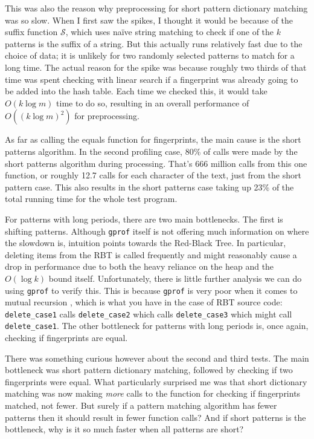 \documentclass[ %
                    author={Dominic Joseph Moylett},
                    degree={MEng},
                     title={Dictionary Matching with Fingerprints},
                  subtitle={An Empirical Analysis},
                      type={research},
                      year={2015} ]{dissertation}
\begin{document}
This was also the reason why preprocessing for short pattern dictionary matching was so slow. When I first saw the spikes, I thought it would be because of the suffix function $\mathcal{S}$, which uses na\"{i}ve string matching to check if one of the $k$ patterns is the suffix of a string. But this actually runs relatively fast due to the choice of data; it is unlikely for two randomly selected patterns to match for a long time. The actual reason for the spike was because roughly two thirds of that time was spent checking with linear search if a fingerprint was already going to be added into the hash table. Each time we checked this, it would take $O(k\log m)$ time to do so, resulting in an overall performance of $O((k\log m)^2)$ for preprocessing.

As far as calling the equals function for fingerprints, the main cause is the short patterns algorithm. In the second profiling case, 80\% of calls were made by the short patterns algorithm during processing. That's 666 million calls from this one function, or roughly 12.7 calls for each character of the text, just from the short pattern case. This also results in the short patterns case taking up 23\% of the total running time for the whole test program.

For patterns with long periods, there are two main bottlenecks. The first is shifting patterns. Although \texttt{gprof} itself is not offering much information on where the slowdown is, intuition points towards the Red-Black Tree. In particular, deleting items from the RBT is called frequently and might reasonably cause a drop in performance due to both the heavy reliance on the heap and the $O(\log k)$ bound itself. Unfortunately, there is little further analysis we can do using \texttt{gprof} to verify this. This is because \texttt{gprof} is very poor when it comes to mutual recursion \cite{SPE:SPE562}, which is what you have in the case of RBT source code: \texttt{delete\_case1} calls \texttt{delete\_case2} which calls \texttt{delete\_case3} which might call \texttt{delete\_case1}. The other bottleneck for patterns with long periods is, once again, checking if fingerprints are equal.

There was something curious however about the second and third tests. The main bottleneck was short pattern dictionary matching, followed by checking if two fingerprints were equal. What particularly surprised me was that short dictionary matching was now making \textit{more} calls to the function for checking if fingerprints matched, not fewer. But surely if a pattern matching algorithm has fewer patterns then it should result in fewer function calls? And if short patterns is the bottleneck, why is it so much faster when all patterns are short?
\end{document}

